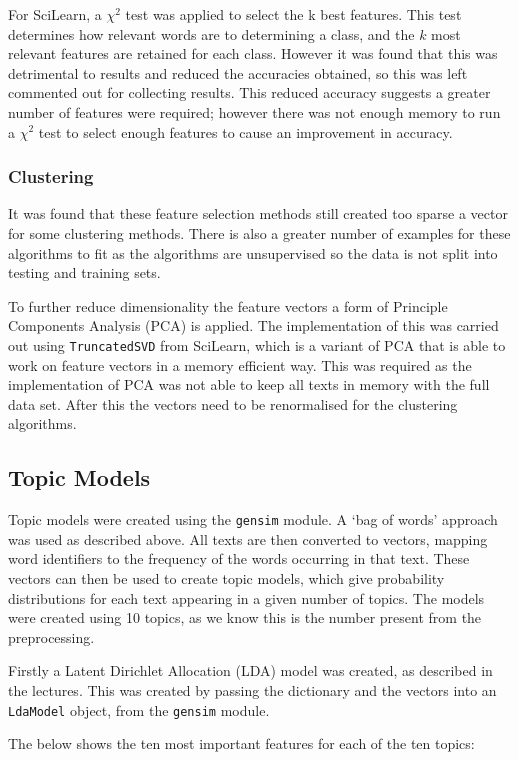 \documentclass{article}
\begin{document}
For SciLearn, a $\chi^2$ test was applied to select the k best features. This test determines how relevant words are to determining a class, and the $k$ most relevant features are retained for each class. However it was found that this was detrimental to results and reduced the accuracies obtained, so this was left commented out for collecting results. This reduced accuracy suggests a greater number of features were required; however there was not enough memory to run a $\chi^2$ test to select enough features to cause an improvement in accuracy.

\subsubsection{Clustering}
It was found that these feature selection methods still created too sparse a vector for some clustering methods. There is also a greater number of examples for these algorithms to fit as the algorithms are unsupervised so the data is not split into testing and training sets.

To further reduce dimensionality the feature vectors a form of Principle Components Analysis (PCA) is applied. The implementation of this was carried out using \verb|TruncatedSVD| from SciLearn, which is a variant of PCA that is able to work on feature vectors in a memory efficient way. This was required as the implementation of PCA was not able to keep all texts in memory with the full data set. After this the vectors need to be renormalised for the clustering algorithms. 

\subsection{Topic Models}
Topic models were created using the \verb|gensim| module. A `bag of words' approach was used as described above. All texts are then converted to vectors, mapping word identifiers to the frequency of the words occurring in that text. These vectors can then be used to create topic models, which give probability distributions for each text appearing in a given number of topics. The models were created using 10 topics, as we know this is the number present from the preprocessing.

Firstly a Latent Dirichlet Allocation (LDA) model was created, as described in the lectures. This was created by passing the dictionary and the vectors into an \verb|LdaModel| object, from the \verb|gensim| module.

The below shows the ten most important features for each of the ten topics:
\end{document}

